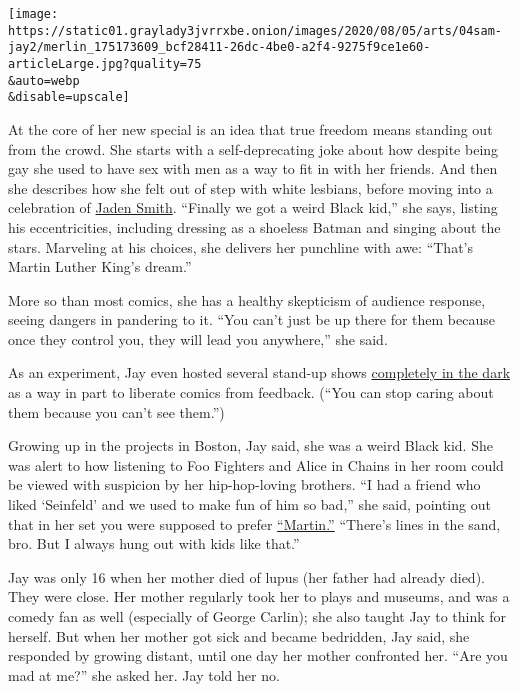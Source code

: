 \texttt{[image: https://static01.graylady3jvrrxbe.onion/images/2020/08/05/arts/04sam-jay2/merlin\_175173609\_bcf28411-26dc-4be0-a2f4-9275f9ce1e60-articleLarge.jpg?quality=75\\\&auto=webp\\\&disable=upscale]}

At the core of her new special is an idea that true freedom means
standing out from the crowd. She starts with a self-deprecating joke
about how despite being gay she used to have sex with men as a way to
fit in with her friends. And then she describes how she felt out of step
with white lesbians, before moving into a celebration of
\href{https://www.cheatsheet.com/entertainment/these-are-the-most-bizarre-things-jaden-smith-ever-said.html/}{Jaden
Smith}. ``Finally we got a weird Black kid,'' she says, listing his
eccentricities, including dressing as a shoeless Batman and singing
about the stars. Marveling at his choices, she delivers her punchline
with awe: ``That's Martin Luther King's dream.''

More so than most comics, she has a healthy skepticism of audience
response, seeing dangers in pandering to it. ``You can't just be up
there for them because once they control you, they will lead you
anywhere,'' she said.

As an experiment, Jay even hosted several stand-up shows
\href{https://thestandnyc.com/shows/show/1129/20191108-1159-pm-nycf-presents-black-out-comedy-in-the-dark-with-sam-jay}{completely
in the dark} as a way in part to liberate comics from feedback. (``You
can stop caring about them because you can't see them.'')

Growing up in the projects in Boston, Jay said, she was a weird Black
kid. She was alert to how listening to Foo Fighters and Alice in Chains
in her room could be viewed with suspicion by her hip-hop-loving
brothers. ``I had a friend who liked `Seinfeld' and we used to make fun
of him so bad,'' she said, pointing out that in her set you were
supposed to prefer
\href{https://theundefeated.com/features/martin-lawrences-martin-20-years-later/}{``Martin.''}
``There's lines in the sand, bro. But I always hung out with kids like
that.''

Jay was only 16 when her mother died of lupus (her father had already
died). They were close. Her mother regularly took her to plays and
museums, and was a comedy fan as well (especially of George Carlin); she
also taught Jay to think for herself. But when her mother got sick and
became bedridden, Jay said, she responded by growing distant, until one
day her mother confronted her. ``Are you mad at me?'' she asked her. Jay
told her no.

